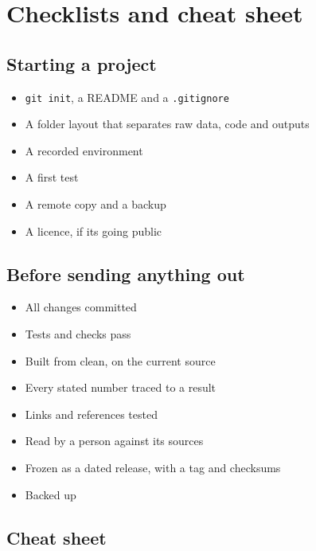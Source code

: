 \chapter{Checklists and cheat sheet}
\label{ch:checklist}

\section{Starting a project}\label{starting-a-project}

\begin{itemize}
\tightlist
\item[$\square$]
  \texttt{git\ init}, a README and a \texttt{.gitignore}
\item[$\square$]
  A folder layout that separates raw data, code and outputs
\item[$\square$]
  A recorded environment
\item[$\square$]
  A first test
\item[$\square$]
  A remote copy and a backup
\item[$\square$]
  A licence, if it\textquotesingle s going public
\end{itemize}

\section{Before sending anything out}\label{before-sending-anything-out}

\begin{itemize}
\tightlist
\item[$\square$]
  All changes committed
\item[$\square$]
  Tests and checks pass
\item[$\square$]
  Built from clean, on the current source
\item[$\square$]
  Every stated number traced to a result
\item[$\square$]
  Links and references tested
\item[$\square$]
  Read by a person against its sources
\item[$\square$]
  Frozen as a dated release, with a tag and checksums
\item[$\square$]
  Backed up
\end{itemize}

\section{Cheat sheet}\label{cheat-sheet}

